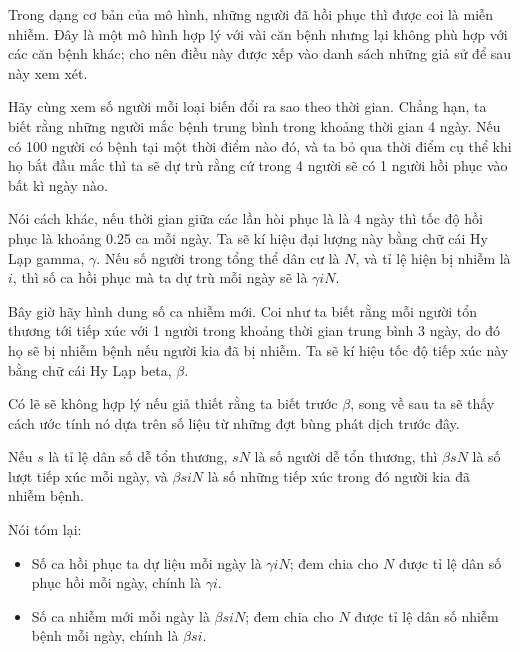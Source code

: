 \documentclass[12pt, openany]{book}
\theoremstyle{exercise}
\begin{document}
Trong dạng cơ bản của mô hình, những người đã hồi phục thì được coi là miễn nhiễm. Đây là một mô hình hợp lý với vài căn bệnh nhưng lại không phù hợp với các căn bệnh khác; cho nên điều này được xếp vào danh sách những giả sử để sau này xem xét.

Hãy cùng xem số người mỗi loại biến đổi ra sao theo thời gian. Chẳng hạn, ta biết rằng những người mắc bệnh trung bình trong khoảng thời gian 4 ngày. Nếu có 100 người có bệnh tại một thời điểm nào đó, và ta bỏ qua thời điểm cụ thể khi họ bắt đầu mắc thì ta sẽ dự trù rằng cứ trong 4 người sẽ có 1 người hồi phục vào bất kì ngày nào. 

Nói cách khác, nếu thời gian giữa các lần hòi phục là là 4 ngày thì tốc độ hồi phục là khoảng 0.25 ca mỗi ngày. Ta sẽ kí hiệu đại lượng này bằng chữ cái Hy Lạp gamma,  $\gamma$. Nếu số người trong tổng thể dân cư là $N$, và tỉ lệ hiện bị nhiễm là $i$, thì số ca hồi phục mà ta dự trù mỗi ngày sẽ là $\gamma i N$.


Bây giờ hãy hình dung số ca nhiễm mới. Coi như ta biết rằng mỗi người tổn thương tới tiếp xúc với 1 người trong khoảng thời gian trung bình 3 ngày, do đó họ sẽ bị nhiễm  bệnh nếu người kia đã bị nhiễm. Ta sẽ kí hiệu tốc độ tiếp xúc này bằng chữ cái Hy Lạp beta, $\beta$.


Có lẽ sẽ không hợp lý nếu giả thiết rằng ta biết trước $\beta$, song về sau ta sẽ thấy cách ước tính nó dựa trên số liệu từ những đợt bùng phát dịch trước đây.

Nếu $s$ là tỉ lệ dân số dễ tổn thương, $s N$ là số người dễ tổn thương, thì $\beta s N$ là số lượt tiếp xúc mỗi ngày, và $\beta s i N$ là số những tiếp xúc trong đó người kia đã nhiễm bệnh.


Nói tóm lại:

\begin{itemize}

\item Số ca hồi phục ta dự liệu mỗi ngày là $\gamma i N$; đem chia cho $N$ được tỉ lệ dân số phục hồi mỗi ngày, chính là $\gamma i$.

\item Số ca nhiễm mới mỗi ngày là $\beta s i N$; đem chia cho $N$ được tỉ lệ dân số nhiễm bệnh mỗi ngày, chính là $\beta s i$.

\end{itemize}
\end{document}
